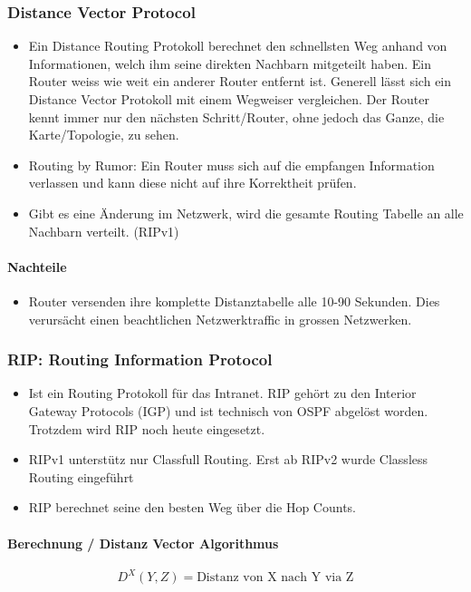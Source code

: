 \subsubsection{Distance Vector Protocol}
\begin{itemize}
	\item Ein Distance Routing Protokoll berechnet den schnellsten Weg anhand von Informationen, welch ihm seine direkten Nachbarn mitgeteilt haben. Ein Router weiss wie weit ein anderer Router entfernt ist. Generell lässt sich ein Distance Vector Protokoll mit einem Wegweiser vergleichen. Der Router kennt immer nur den nächsten Schritt/Router, ohne jedoch das Ganze, die Karte/Topologie, zu sehen.
	\item Routing by Rumor: Ein Router muss sich auf die empfangen Information verlassen und kann diese nicht auf ihre Korrektheit prüfen.
	\item Gibt es eine Änderung im Netzwerk, wird die gesamte Routing Tabelle an alle Nachbarn verteilt. (RIPv1)
\end{itemize}

\paragraph{Nachteile}
\begin{itemize}
	\item Router versenden ihre komplette Distanztabelle alle 10-90 Sekunden. Dies verursächt einen beachtlichen Netzwerktraffic in grossen Netzwerken.
\end{itemize}

\subsubsection{RIP: Routing Information Protocol}
\begin{itemize}
	\item Ist ein Routing Protokoll für das Intranet. RIP gehört zu den Interior Gateway Protocols (IGP) und ist technisch von OSPF abgelöst worden. Trotzdem wird RIP noch heute eingesetzt.
	\item RIPv1 unterstütz nur Classfull Routing. Erst ab RIPv2 wurde Classless Routing eingeführt
	\item RIP berechnet seine den besten Weg über die Hop Counts.	
\end{itemize}

\paragraph{Berechnung / Distanz Vector Algorithmus}
\[
	D^{X}(Y, Z) = \text{Distanz von X nach Y via Z} 
\]

